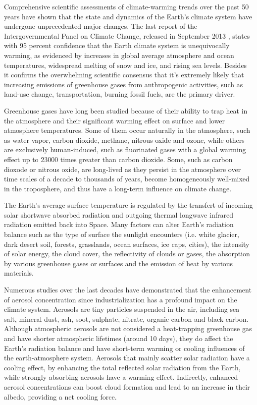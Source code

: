 Comprehensive  scientific assessments  of climate-warming  trends over
the  past 50  years have  shown  that the  state and  dynamics of  the
Earth's  climate system  have undergone  unprecedented  major changes.
The  last report  of the  Intergovernmental Panel  on  Climate Change,
released  in  September  2013  \citep{IPCC}, states  with  95  percent
confidence that the Earth  climate system is unequivocally warming, as
evidenced  by  increases  in   global  average  atmosphere  and  ocean
temperatures,  widespread melting  of  snow and  ice,  and rising  sea
levels.   Besides it  confirms the  overwhelming  scientific consensus
that  it's extremely  likely that  increasing emissions  of greenhouse
gases  from   anthropogenic  activities,  such   as  land-use  change,
transportation, burning fossil fuels, are the primary driver.

Greenhouse gases  have long been  studied because of their  ability to
trap heat  in the atmosphere  and their significant warming  effect on
surface  and  lower  atmosphere  temperatures.   Some  of  them  occur
naturally  in the  atmosphere, such  as water  vapor,  carbon dioxide,
methane,  nitrous  oxide  and  ozone,  while  others  are  exclusively
human-induced, such as fluorinated  gases with a global warming effect
up to  23000 times greater than  carbon dioxide. Some,  such as carbon
dioxode  or nitrous  oxide,  are  long-lived as  they  persist in  the
atmosphere over time scales of  a decade to thousands of years, become
homogeneously well-mixed in the troposphere, and thus have a long-term
influence on climate change.

The Earth's average surface  temperature is regulated by the transfert
of incoming  solar shortwave  absorbed radiation and  outgoing thermal
longwave infrared radiation emitted  back into Space. Many factors can
alter  Earth's radiation  balance  such  as the  type  of surface  the
sunlight encounters  (i.e.  white glacier, dark  desert soil, forests,
grasslands, ocean surfaces, ice  caps, cities), the intensity of solar
energy,  the cloud  cover, the  reflectivity of  clouds or  gases, the
absorption by various greenhouse gases or surfaces and the emission of
heat by various materials.

Numerous  studies over  the last  decades have  demonstrated  that the
enhancement  of aerosol  concentration since  industrialization  has a
profound impact  on the climate  system.  Aerosols are  tiny particles
suspended in  the air,  including sea salt,  mineral dust,  ash, soot,
sulphate,   nitrate,  organic  carbon   and  black   carbon.  Although
atmospheric aerosols are not considered a heat-trapping greenhouse gas
and  have shorter  atmospheric  lifetimes (around  10  days), they  do
affect the  Earth's radiation balance  and have short-term  warming or
cooling  influences  of the  earth-atmosphere  system.  Aerosols  that
mainly scatter solar radiation have a cooling effect, by enhancing the
total  reflected  solar  radiation  from  the  Earth,  while  strongly
absorbing  aerosols  have  a  warming  effect.   Indirectly,  enhanced
aerosol  concentrations  can boost  cloud  formation  and  lead to  an
increase in their albedo, providing a net cooling force.

